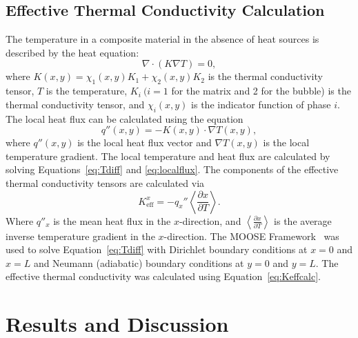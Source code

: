 \subsection{Effective Thermal Conductivity Calculation}
\label{subsec:Keffcalc}
The temperature in a composite material in the absence of heat sources is described by the heat equation:
\begin{equation}
\nabla \cdot \left(K\nabla T \right)=0,
\label{eq:Tdiff}
\end{equation}
where $K(x,y)=\chi_1(x,y)K_1 + \chi_2(x,y)K_2$ is the thermal conductivity tensor, $T$ is the temperature, $K_i\ { }(i=1$ for the matrix and 2 for the bubble) is the thermal conductivity tensor, and $\chi_i(x,y)$ is the indicator function of phase $i$. The local heat flux can be calculated using the equation
\begin{equation}
\label{eq:localflux}
q''(x,y) = -K(x,y) \cdot \nabla T(x,y),
\end{equation}
where $q''(x,y)$ is the local heat flux vector and $\nabla T(x,y)$ is the local temperature gradient. The local temperature and heat flux are calculated by solving Equations~\eqref{eq:Tdiff} and \eqref{eq:localflux}. The components of the effective thermal conductivity tensors are calculated via 
\begin{equation}
\label{eq:Keffcalc}
K_{\text{eff}}^x = -q_x''\left<\frac{\partial x}{\partial T}\right>.
\end{equation}
Where $q''_x$ is the mean heat flux in the $x$-direction, and $\left<\frac{\partial x}{\partial T}\right>$ is the average inverse temperature gradient in the $x$-direction. The MOOSE Framework~\cite{gaston2009moose} was used to solve Equation~\eqref{eq:Tdiff} with Dirichlet boundary conditions at $x=0$ and $x=L$ and Neumann (adiabatic) boundary conditions at $y=0$ and $y=L$. The effective thermal conductivity was calculated using Equation~\eqref{eq:Keffcalc}.



\section{\label{sec:results}Results and Discussion}

